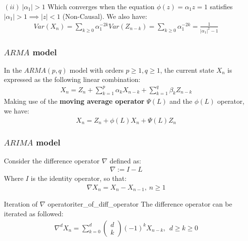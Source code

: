 \begin{proof*}
\begin{subproof}{\newline $(ii) \ |\alpha_1| > 1$}
        \noindent Which converges when the equation $\phi(z)=\alpha_1z=1$ satisfies $|\alpha_1| > 1 \implies |z| < 1$ (Non-Causal).
        \noindent We also have:
        \begin{align*}
            Var(X_n) = \sum_{k\ge0} \alpha_1^{-2k}Var(Z_{n-k}) = \sum_{k\ge0}\alpha_1^{-2k} = \frac{1}{|\alpha_1|^2-1}
        \end{align*}
    \end{subproof}
\end{proof*}

\subsubsection{$ARMA$ model}
\begin{definition}
    In the $ARMA(p,q)$ model with orders $p\ge1, q\ge1$, the current state $X_n$ is expressed as the following linear combination:
    \begin{align*}
        \boxed{
            X_n = Z_n + \sum_{k=1}^p \alpha_k X_{n-k} + \sum_{k=1}^q \beta_k Z_{n-k} 
        }
    \end{align*}
    \noindent Making use of the \textbf{moving average operator} $\Psi(L)$ and the $\phi(L)$ operator, we have:
    \begin{align*}
        \boxed{
            X_n =  Z_n + \phi(L)X_n + \Psi(L)Z_n
        }
    \end{align*}
\end{definition}


\subsubsection{$ARIMA$ model}
\begin{definition}
    Consider the difference operator $\nabla$ defined as:
    \begin{align*}
        \nabla := I - L
    \end{align*}
    \noindent Where $I$ is the identity operator, so that:
    \begin{align*}
        \nabla X_n = X_n - X_{n-1}, \ n\ge1
    \end{align*}
\end{definition}

\begin{proposition}{Iteration of $\nabla$ operator}{iter_of_diff_operator}
    The difference operator can be iterated as followed:
    \begin{align*}
        \nabla^d X_n = \sum_{k=0}^d \begin{pmatrix}
            d \\ k
        \end{pmatrix} (-1)^kX_{n-k}, \ \ d \ge k \ge 0
    \end{align*}
\end{proposition}

